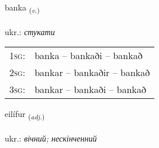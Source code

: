 \documentclass[frontgrid, backgrid]{flacards}\usepackage[]{graphicx}\usepackage[]{xcolor}
\begin{document}
\renewcommand{\blhead}{\vskip5pt {\small\bfseries\footnotesize Sagnorð | дієслово }}
\renewcommand{\bcfoot}{\vskip5pt \hspace{2pt}{\small\bfseries\footnotesize 3K}}


{banka \small{\textsubscript{(\textit{v.})}} \\[1ex] %
\textphonetic{[pauŋ̥ka]} \\
ukr.: \emph{стукати} \\  [2ex]
\renewcommand*{\arraystretch}{0.8}
\begin{tabular}{p{1cm}l}
\textsc{1sg}: & banka -- bankaði -- bankað \\ 
\textsc{2sg}: & bankar -- bankaðir -- bankað \\ 
\textsc{3sg}: & bankar -- bankaði -- bankað \\ 
\end{tabular}
}

\renewcommand{\flhead}{\vskip5pt \fboxsep=0pt {\small\bfseries\footnotesize Lýsingarorð | прикметник}}
\renewcommand{\fcfoot}{\vskip5pt \fboxsep=0pt \hspace{2pt}{\small\bfseries\footnotesize 3K}}

\renewcommand{\blhead}{\vskip5pt {\small\bfseries\footnotesize Lýsingarorð | прикметник }}
\renewcommand{\bcfoot}{\vskip5pt \hspace{2pt}{\small\bfseries\footnotesize 3K}}


{eilífur \small{\textsubscript{(\textit{adj.})}} \\[1ex] %
\textphonetic{[eiːlivʏr]} \\
ukr.: \emph{вічний; нескінченний} \\  [2ex]
\renewcommand*{\arraystretch}{0.8}
}
\end{document}
